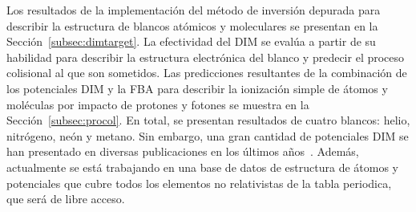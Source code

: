 Los resultados de la implementación del método de inversión depurada 
para describir la estructura de blancos atómicos y moleculares se 
presentan en la Sección~\ref{subsec:dimtarget}. La efectividad del DIM 
se evalúa a partir de su habilidad para describir la estructura 
electrónica del blanco y predecir el proceso colisional al que son 
sometidos. Las predicciones resultantes de la combinación de los 
potenciales DIM y la FBA para describir la ionización simple de átomos y 
moléculas por impacto de protones y fotones se muestra en la 
Sección~\ref{subsec:procol}. En total, se presentan 
resultados de cuatro blancos: helio, nitrógeno, neón y metano. Sin 
embargo, una gran cantidad de potenciales DIM se han presentado en 
diversas publicaciones en los últimos años~\cite{Mendez:16,Mendez:19dim,
Mendez:18}. Además, actualmente se está trabajando en una base de datos 
de estructura de átomos y potenciales que cubre todos los elementos no 
relativistas de la tabla periodica, que será de libre acceso.

